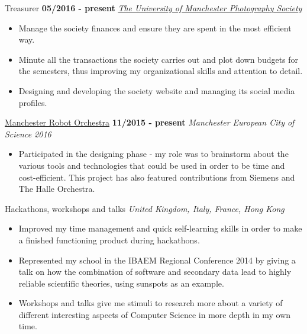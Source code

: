 \documentclass[]{friggeri-cv}
\begin{document}
\begin{entrylist}
\begin{itemize}
    \end{itemize}
  \entry
    {}
    {Treasurer}
    {\textbf{05/2016 - present}}
    {\emph{\href{https://www.facebook.com/UoMPhotoSoc/}{The University of Manchester Photography Society}}}
    \begin{itemize}
        \item Manage the society finances and ensure they are spent in the most efficient way.
        \item Minute all the transactions the society carries out and plot down budgets for the se\-mes\-ters, thus improving my organizational skills and attention to detail.
        \item Designing and developing the society website and managing its social media profiles. \\
    \end{itemize}
  \entry
    {}
    {\href{http://manchestersciencecity.com/inspire/article/the-robots-are-coming/}{Manchester Robot Orchestra}}
    {\textbf{11/2015 - present}}
    {\emph{Manchester European City of Science 2016}}
    \begin{itemize}
        \item Participated in the designing phase - my role was to brainstorm about the various tools and technologies that could be used in order to be time and cost-efficient. This project has also featured contributions from Siemens and The Halle Orchestra.
    \end{itemize}
  \entry
    {\null}
    {Hackathons, workshops and talks}
    {}
    {\emph{United Kingdom, Italy, France, Hong Kong}}
    \begin{itemize}
        \item Improved my time management and quick self-learning skills in order to make a finished functioning product during hackathons.
        \item Represented my school in the IBAEM Regional Conference 2014 by giving a talk on how the combination of software and secondary data lead to highly reliable scientific theories, using sunspots as an example.
        \item Workshops and talks give me stimuli to research more about a variety of different interesting aspects of Computer Science in more depth in my own time.
    \end{itemize}
\end{entrylist}
\end{document}

